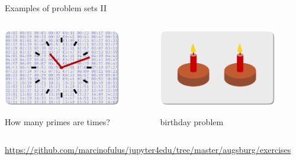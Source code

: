 \documentclass[svgnames]{beamer}
\begin{document}
\begin{frame}{Examples of problem sets II}
 \begin{columns}[t]
  \begin{column}{0.5\textwidth}
   \begin{center}
    \includegraphics[width=0.8\textwidth]{primetime}

    How many primes are times?
   \end{center}
  \end{column}%
  \begin{column}{0.5\textwidth}
   \begin{center}
    \includegraphics[width=0.8\textwidth]{birthday}

    birthday problem
   \end{center}
  \end{column}%
 \end{columns}

 \vspace{0.4truecm}
 {\scriptsize\url{https://github.com/marcinofulus/jupyter4edu/tree/master/augsburg/exercises}}
\end{frame}
\end{document}
